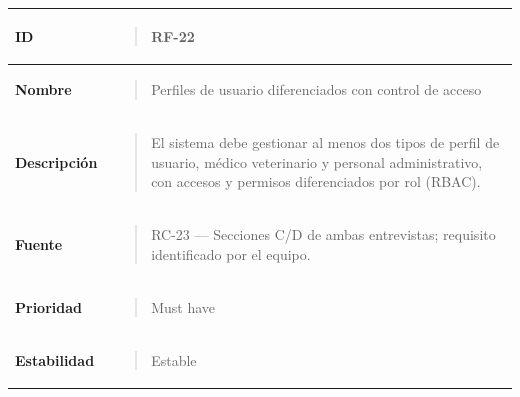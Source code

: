 \documentclass[
]{article}
\newcounter{none} %
\begin{document}
{\def\LTcaptype{none} %
\begin{longtable}[]{@{}
  >{\raggedright\arraybackslash}p{}
  >{\raggedright\arraybackslash}p{}@{}}
\toprule\noalign{}
\begin{minipage}[b]{\linewidth}\raggedright
\textbf{ID}
\end{minipage} & \begin{minipage}[b]{\linewidth}\raggedright
\begin{quote}
RF-22
\end{quote}
\end{minipage} \\
\midrule\noalign{}
\endhead
\bottomrule\noalign{}
\endlastfoot
\textbf{Nombre} & \begin{minipage}[t]{\linewidth}\raggedright
\begin{quote}
Perfiles de usuario diferenciados con control de acceso
\end{quote}
\end{minipage} \\
\textbf{Descripción} & \begin{minipage}[t]{\linewidth}\raggedright
\begin{quote}
El sistema debe gestionar al menos dos tipos de perfil de usuario,
médico veterinario y personal administrativo, con accesos y permisos
diferenciados por rol (RBAC).
\end{quote}
\end{minipage} \\
\textbf{Fuente} & \begin{minipage}[t]{\linewidth}\raggedright
\begin{quote}
RC-23 --- Secciones C/D de ambas entrevistas; requisito identificado por
el equipo.
\end{quote}
\end{minipage} \\
\textbf{Prioridad} & \begin{minipage}[t]{\linewidth}\raggedright
\begin{quote}
Must have
\end{quote}
\end{minipage} \\
\textbf{Estabilidad} & \begin{minipage}[t]{\linewidth}\raggedright
\begin{quote}
Estable
\end{quote}
\end{minipage} \\

\end{longtable}}
\end{document}
